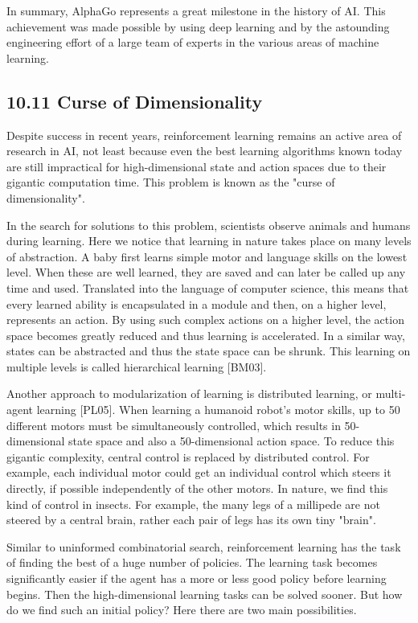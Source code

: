 \documentclass[10pt]{article}
\begin{document}
In summary, AlphaGo represents a great milestone in the history of AI. This achievement was made possible by using deep learning and by the astounding engineering effort of a large team of experts in the various areas of machine learning.

\subsection*{10.11 Curse of Dimensionality}
Despite success in recent years, reinforcement learning remains an active area of research in AI, not least because even the best learning algorithms known today are still impractical for high-dimensional state and action spaces due to their gigantic computation time. This problem is known as the "curse of dimensionality".

In the search for solutions to this problem, scientists observe animals and humans during learning. Here we notice that learning in nature takes place on many levels of abstraction. A baby first learns simple motor and language skills on the lowest level. When these are well learned, they are saved and can later be called up any time and used. Translated into the language of computer science, this means that every learned ability is encapsulated in a module and then, on a higher level, represents an action. By using such complex actions on a higher level, the action space becomes greatly reduced and thus learning is accelerated. In a similar way, states can be abstracted and thus the state space can be shrunk. This learning on multiple levels is called hierarchical learning [BM03].

Another approach to modularization of learning is distributed learning, or multi-agent learning [PL05]. When learning a humanoid robot's motor skills, up to 50 different motors must be simultaneously controlled, which results in 50-dimensional state space and also a 50-dimensional action space. To reduce this gigantic complexity, central control is replaced by distributed control. For example, each individual motor could get an individual control which steers it directly, if possible independently of the other motors. In nature, we find this kind of control in insects. For example, the many legs of a millipede are not steered by a central brain, rather each pair of legs has its own tiny "brain".

Similar to uninformed combinatorial search, reinforcement learning has the task of finding the best of a huge number of policies. The learning task becomes significantly easier if the agent has a more or less good policy before learning begins. Then the high-dimensional learning tasks can be solved sooner. But how do we find such an initial policy? Here there are two main possibilities.
\end{document}
